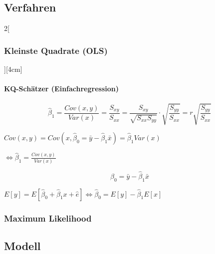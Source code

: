 \documentclass[8pt]{extarticle}
\begin{document}
\subsection{Verfahren}
\begin{multicols}{2}[\subsubsection{Kleinste Quadrate (OLS)}][4cm]

\paragraph{KQ-Schätzer (Einfachregression)}

$$\hat{\beta}_1=\frac{Cov(x,y)}{Var(x)}=\frac{S_{xy}}{S_{xx}}= \frac{S_{xy}}{\sqrt{S_{xx}S_{yy}}} \cdot \sqrt{\frac{S_{yy}}{S_{xx}}}=r\sqrt{\frac{S_{yy}}{S_{xx}}}$$

\begin{Beweis}
$Cov(x,y)=Cov(x,\hat{\beta}_0=\bar{y}-\hat{\beta}_1\bar{x})=\hat{\beta}_1Var(x)$

\raggedleft
$ \iff \hat{\beta}_1= \frac{Cov(x,y)}{Var(x)}$
\end{Beweis}

$$\hat{\beta}_0=\bar{y}-\hat{\beta}_1\bar{x}$$

\begin{Beweis}
$E\left[y\right] = E\left[\hat{\beta}_0+\hat{\beta}_1 x+\hat{e}\right] \iff \hat{\beta}_0 = E\left[y\right] - \hat{\beta}_1E\left[x\right]$
\end{Beweis}

\end{multicols}
\subsubsection{Maximum Likelihood}

\subsection{Modell}
\end{document}

